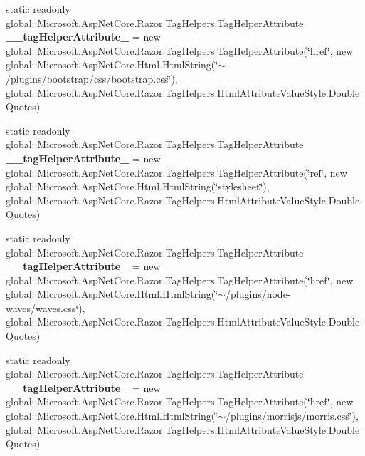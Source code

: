 \begin{DoxyCompactItemize}
static readonly global\+::\+Microsoft.\+Asp\+Net\+Core.\+Razor.\+Tag\+Helpers.\+Tag\+Helper\+Attribute {\bfseries \+\_\+\+\_\+tag\+Helper\+Attribute\+\_} = new global\+::\+Microsoft.\+Asp\+Net\+Core.\+Razor.\+Tag\+Helpers.\+Tag\+Helper\+Attribute(\char`\"{}href\char`\"{}, new global\+::\+Microsoft.\+Asp\+Net\+Core.\+Html.\+Html\+String(\char`\"{}$\sim$/plugins/bootstrap/css/bootstrap.\+css\char`\"{}), global\+::\+Microsoft.\+Asp\+Net\+Core.\+Razor.\+Tag\+Helpers.\+Html\+Attribute\+Value\+Style.\+Double\+Quotes)
\item 
\mbox{\label{class_asp_net_core_1_1_views___shared____head_ad5fdd730119813a2ac21874daeb282c8}} 
static readonly global\+::\+Microsoft.\+Asp\+Net\+Core.\+Razor.\+Tag\+Helpers.\+Tag\+Helper\+Attribute {\bfseries \+\_\+\+\_\+tag\+Helper\+Attribute\+\_} = new global\+::\+Microsoft.\+Asp\+Net\+Core.\+Razor.\+Tag\+Helpers.\+Tag\+Helper\+Attribute(\char`\"{}rel\char`\"{}, new global\+::\+Microsoft.\+Asp\+Net\+Core.\+Html.\+Html\+String(\char`\"{}stylesheet\char`\"{}), global\+::\+Microsoft.\+Asp\+Net\+Core.\+Razor.\+Tag\+Helpers.\+Html\+Attribute\+Value\+Style.\+Double\+Quotes)
\item 
\mbox{\label{class_asp_net_core_1_1_views___shared____head_a79e9aec3489db7c3616e3feae7cfedcf}} 
static readonly global\+::\+Microsoft.\+Asp\+Net\+Core.\+Razor.\+Tag\+Helpers.\+Tag\+Helper\+Attribute {\bfseries \+\_\+\+\_\+tag\+Helper\+Attribute\+\_} = new global\+::\+Microsoft.\+Asp\+Net\+Core.\+Razor.\+Tag\+Helpers.\+Tag\+Helper\+Attribute(\char`\"{}href\char`\"{}, new global\+::\+Microsoft.\+Asp\+Net\+Core.\+Html.\+Html\+String(\char`\"{}$\sim$/plugins/node-\/waves/waves.\+css\char`\"{}), global\+::\+Microsoft.\+Asp\+Net\+Core.\+Razor.\+Tag\+Helpers.\+Html\+Attribute\+Value\+Style.\+Double\+Quotes)
\item 
\mbox{\label{class_asp_net_core_1_1_views___shared____head_a562bfdb0324a95323ee82707119bf65f}} 
static readonly global\+::\+Microsoft.\+Asp\+Net\+Core.\+Razor.\+Tag\+Helpers.\+Tag\+Helper\+Attribute {\bfseries \+\_\+\+\_\+tag\+Helper\+Attribute\+\_} = new global\+::\+Microsoft.\+Asp\+Net\+Core.\+Razor.\+Tag\+Helpers.\+Tag\+Helper\+Attribute(\char`\"{}href\char`\"{}, new global\+::\+Microsoft.\+Asp\+Net\+Core.\+Html.\+Html\+String(\char`\"{}$\sim$/plugins/morrisjs/morris.\+css\char`\"{}), global\+::\+Microsoft.\+Asp\+Net\+Core.\+Razor.\+Tag\+Helpers.\+Html\+Attribute\+Value\+Style.\+Double\+Quotes)

\end{DoxyCompactItemize}
